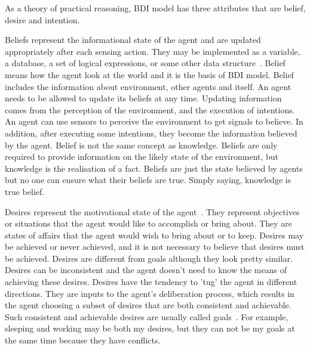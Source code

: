 As a theory of practical reasoning, BDI model has three attributes that are belief, desire and intention.

Beliefs represent the informational state of the agent and are updated appropriately after each sensing action. They may be implemented as a variable, a database, a set of logical expressions, or some other data structure~\cite{Rao_BDITheory_1995}. Belief means how the agent look at the world and it is the basis of BDI model. Belief includes the information about environment, other agents and itself. An agent needs to be allowed to update its beliefs at any time. Updating information comes from the perception of the environment, and the execution of intentions. An agent can use sensors to perceive the environment to get signals to believe. In addition, after executing some intentions, they become the information believed by the agent. Belief is not the same concept as knowledge. Beliefs are only required to provide information on the likely state of the environment, but knowledge is the realisation of a fact. Beliefs are just the state believed by agents but no one can ensure what their beliefs are true. Simply saying, knowledge is true belief.

Desires represent the motivational state of the agent~\cite{Rao_BDITheory_1995}. They represent objectives or situations that the agent would like to accomplish or bring about. They are states of affairs that the agent would wish to bring about or to keep. Desires may be achieved or never achieved, and it is not necessary to believe that desires must be achieved. Desires are different from goals although they look pretty similar. Desires can be inconsistent and the agent doesn't need to know the means of achieving these desires. Desires have the tendency to 'tug' the agent in different directions. They are inputs to the agent's deliberation process, which results in the agent choosing a subset of desires that are both consistent and achievable. Such consistent and achievable desires are usually called goals~\cite{Gerhard_MultiSystem_1999}. For example, sleeping and working may be both my desires, but they can not be my goals at the same time because they have conflicts.

